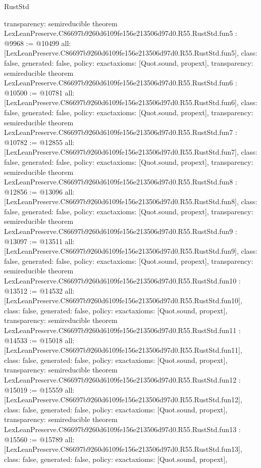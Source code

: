 \begin{lexlean}{RustStd}
\begin{coremodule}
{  transparency: semireducible
}
theorem LexLeanPreserve.C86697b9260d6109fe156e213506d97d0.R55.RustStd.fun5 : @9968 := @10499 {
  all: [LexLeanPreserve.C86697b9260d6109fe156e213506d97d0.R55.RustStd.fun5],
  class: false,
  generated: false,
  policy: exact{axioms: [Quot.sound, propext]},
  transparency: semireducible
}
theorem LexLeanPreserve.C86697b9260d6109fe156e213506d97d0.R55.RustStd.fun6 : @10500 := @10781 {
  all: [LexLeanPreserve.C86697b9260d6109fe156e213506d97d0.R55.RustStd.fun6],
  class: false,
  generated: false,
  policy: exact{axioms: [Quot.sound, propext]},
  transparency: semireducible
}
theorem LexLeanPreserve.C86697b9260d6109fe156e213506d97d0.R55.RustStd.fun7 : @10782 := @12855 {
  all: [LexLeanPreserve.C86697b9260d6109fe156e213506d97d0.R55.RustStd.fun7],
  class: false,
  generated: false,
  policy: exact{axioms: [Quot.sound, propext]},
  transparency: semireducible
}
theorem LexLeanPreserve.C86697b9260d6109fe156e213506d97d0.R55.RustStd.fun8 : @12856 := @13096 {
  all: [LexLeanPreserve.C86697b9260d6109fe156e213506d97d0.R55.RustStd.fun8],
  class: false,
  generated: false,
  policy: exact{axioms: [Quot.sound, propext]},
  transparency: semireducible
}
theorem LexLeanPreserve.C86697b9260d6109fe156e213506d97d0.R55.RustStd.fun9 : @13097 := @13511 {
  all: [LexLeanPreserve.C86697b9260d6109fe156e213506d97d0.R55.RustStd.fun9],
  class: false,
  generated: false,
  policy: exact{axioms: [Quot.sound, propext]},
  transparency: semireducible
}
theorem LexLeanPreserve.C86697b9260d6109fe156e213506d97d0.R55.RustStd.fun10 : @13512 := @14532 {
  all: [LexLeanPreserve.C86697b9260d6109fe156e213506d97d0.R55.RustStd.fun10],
  class: false,
  generated: false,
  policy: exact{axioms: [Quot.sound, propext]},
  transparency: semireducible
}
theorem LexLeanPreserve.C86697b9260d6109fe156e213506d97d0.R55.RustStd.fun11 : @14533 := @15018 {
  all: [LexLeanPreserve.C86697b9260d6109fe156e213506d97d0.R55.RustStd.fun11],
  class: false,
  generated: false,
  policy: exact{axioms: [Quot.sound, propext]},
  transparency: semireducible
}
theorem LexLeanPreserve.C86697b9260d6109fe156e213506d97d0.R55.RustStd.fun12 : @15019 := @15559 {
  all: [LexLeanPreserve.C86697b9260d6109fe156e213506d97d0.R55.RustStd.fun12],
  class: false,
  generated: false,
  policy: exact{axioms: [Quot.sound, propext]},
  transparency: semireducible
}
theorem LexLeanPreserve.C86697b9260d6109fe156e213506d97d0.R55.RustStd.fun13 : @15560 := @15789 {
  all: [LexLeanPreserve.C86697b9260d6109fe156e213506d97d0.R55.RustStd.fun13],
  class: false,
  generated: false,
  policy: exact{axioms: [Quot.sound, propext]},
}
\end{coremodule}
\end{lexlean}

